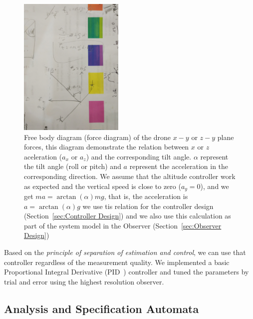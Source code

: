 \documentclass[ twoside, 12pt ]{article}
\begin{document}
\begin{figure} %
    \centerline{\includegraphics[width=50mm]{acceleration_static_diagram.jpg}}
    \caption{Free body diagram (force diagram) of the drone $x-y$ or $z-y$ plane forces, this diagram demonstrate the relation between $x$ or $z$ aceleration ($a_x$ or $a_z$) and the corresponding tilt angle. $\alpha$ represent the tilt angle (roll or pitch) and $a$ represent the acceleration in the corresponding direction. We assume that the altitude controller work as expected and the vertical speed is close to zero ($a_y = 0$), and we get $m a = \arctan(\alpha) mg$, that is, the acceleration is $a = \arctan(\alpha) g$ we use tis relation for the controller design (Section~\ref{sec:Controller Design}) and we also use this calculation as part of the system model in the Observer (Section~\ref{sec:Observer Design}) }
    \label{fig:acceleration_static_diagram}
\end{figure}

Based on the \textit{principle of separation of estimation and control}, we can use that controller regardless of the measurement quality. We implemented a basic Proportional Integral Derivative (PID~\cite{aastrom2006advanced}) controller and tuned the parameters by trial and error using the highest resolution observer.

\subsection{Analysis and Specification Automata}
\label{sec:Analysis}
\end{document}
